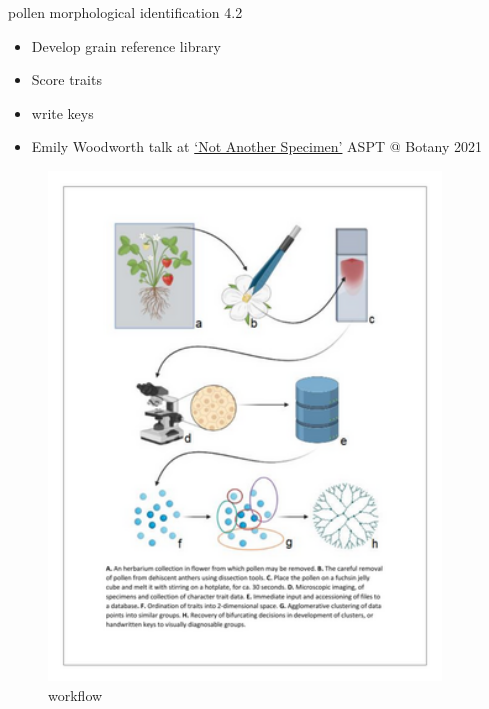 \documentclass[
  ignorenonframetext,
]{beamer}
\providecommand{\tightlist}{%
  \setlength{\itemsep}{0pt}\setlength{\parskip}{0pt}}
\begin{document}
\begin{frame}{pollen morphological identification 4.2}
\protect\hypertarget{pollen-morphological-identification-4.2}{}
\begin{itemize}
\tightlist
\item
  Develop grain reference library
\item
  Score traits
\item
  write keys
\item
  Emily Woodworth talk at
  \href{https://2021.botanyconference.org/engine/search/index.php?func=detail\&aid=924}{`Not
  Another Specimen'} ASPT @ Botany 2021
\end{itemize}

\begin{figure}
\centering
\includegraphics[width=0.93\textwidth,height=\textheight]{../graphics/assorted/mircoscopy_workflow.resized.png}
\caption{workflow}
\end{figure}
\end{frame}
\end{document}
